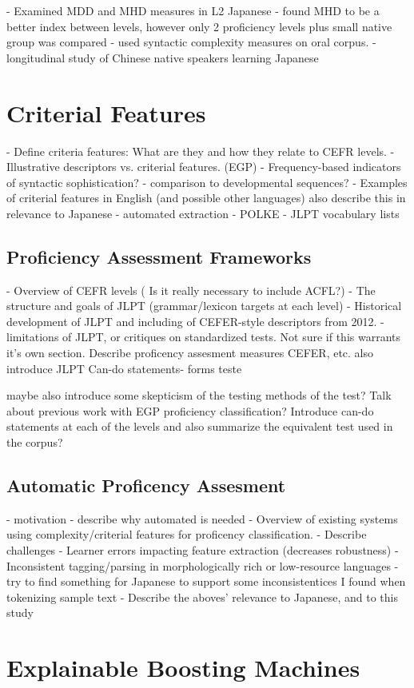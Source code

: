 \citet{komori2019} - Examined MDD and MHD measures in L2 Japanese - found MHD to be a better index between levels,
however only 2 proficiency levels plus small native group was compared
\citet{Iwashita2006} - used syntactic complexity measures on oral corpus.
\citet{Yang2023} - longitudinal study of Chinese native speakers learning Japanese

\section{Criterial Features}
- Define criteria features: What are they and how they relate to CEFR levels.
- Illustrative descriptors vs. criterial features. (EGP)
- Frequency-based indicators of syntactic sophistication? \cite{Ellis2004}
    - comparison to developmental sequences?
- Examples of criterial features in English (and possible other languages) also describe this in relevance to Japanese
- automated extraction - POLKE
- JLPT vocabulary lists


\subsection{Proficiency Assessment Frameworks}
- Overview of CEFR levels ( Is it really necessary to include ACFL?)
- The structure and goals of JLPT (grammar/lexicon targets at each level)
- Historical development of JLPT and including of CEFER-style descriptors from 2012.
- limitations of JLPT, or critiques on standardized tests.
Not sure if this warrants it's own section. Describe proficency assesment measures CEFER, etc. also introduce JLPT
Can-do statements- forms teste


maybe also introduce some skepticism of the testing methods of the test?
Talk about previous work with EGP proficiency classification?
Introduce can-do statements at each of the levels and also summarize the equivalent test used in the corpus?


\subsection{Automatic Proficency Assesment}
- motivation - describe why automated is needed
- Overview of existing systems using complexity/criterial features for proficency classification.
- Describe challenges
    - Learner errors impacting feature extraction (decreases robustness)
    -Inconsistent tagging/parsing in morphologically rich or low-resource languages
        -try to find something for Japanese to support some inconsistentices I found when tokenizing sample text
- Describe the aboves' relevance to Japanese, and to this study

\section{Explainable Boosting Machines}

